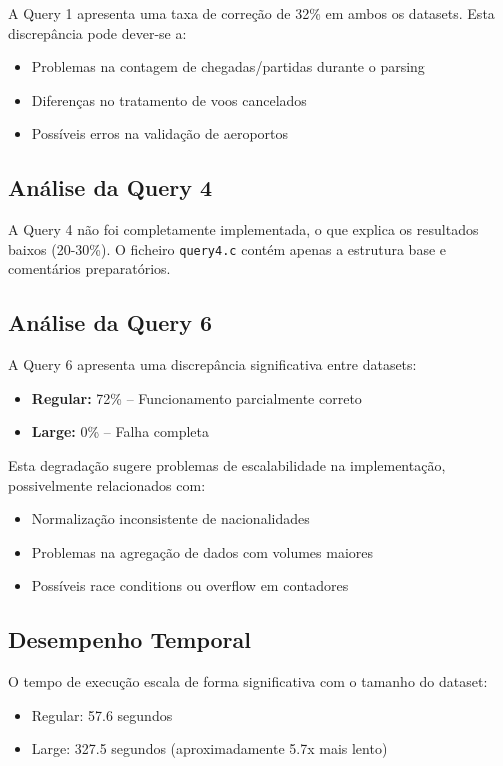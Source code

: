 \documentclass[a4paper,12pt]{scrreprt}
\begin{document}
A Query 1 apresenta uma taxa de correção de 32\% em ambos os datasets. Esta discrepância pode dever-se a:
\begin{itemize}
    \item Problemas na contagem de chegadas/partidas durante o parsing
    \item Diferenças no tratamento de voos cancelados
    \item Possíveis erros na validação de aeroportos
\end{itemize}

\subsection{Análise da Query 4}

A Query 4 não foi completamente implementada, o que explica os resultados baixos (20-30\%). O ficheiro \texttt{query4.c} contém apenas a estrutura base e comentários preparatórios.

\subsection{Análise da Query 6}

A Query 6 apresenta uma discrepância significativa entre datasets:
\begin{itemize}
    \item \textbf{Regular:} 72\% -- Funcionamento parcialmente correto
    \item \textbf{Large:} 0\% -- Falha completa
\end{itemize}

Esta degradação sugere problemas de escalabilidade na implementação, possivelmente relacionados com:
\begin{itemize}
    \item Normalização inconsistente de nacionalidades
    \item Problemas na agregação de dados com volumes maiores
    \item Possíveis race conditions ou overflow em contadores
\end{itemize}

\subsection{Desempenho Temporal}

O tempo de execução escala de forma significativa com o tamanho do dataset:
\begin{itemize}
    \item Regular: 57.6 segundos
    \item Large: 327.5 segundos (aproximadamente 5.7x mais lento)
\end{itemize}
\end{document}
